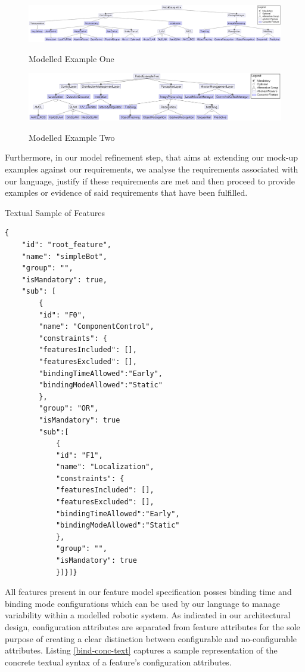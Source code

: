 \documentclass[conference]{IEEEtran}
\begin{document}
\begin{figure}[H]
\caption{Modelled Example One}
\centering
\includegraphics[width=\columnwidth]{diagrams/ex1.png}
\label{ex1}
\end{figure}

\begin{figure}[H]
\caption{Modelled Example Two}
\centering
\includegraphics[width=\columnwidth]{diagrams/ex2.png}
\label{ex2}
\end{figure}
    
Furthermore, in our model refinement step, that aims at extending our mock-up examples against our requirements, we analyse the requirements associated with our language, justify if these requirements are met and then proceed to provide examples or evidence of said requirements that have been fulfilled.

\begin{listing}
\caption{Textual Sample of Features}
\begin{verbatim}
{
    "id": "root_feature",
    "name": "simpleBot",
    "group": "",
    "isMandatory": true,
    "sub": [
        {
        "id": "F0",
        "name": "ComponentControl",
        "constraints": {
        "featuresIncluded": [],
        "featuresExcluded": [],
        "bindingTimeAllowed":"Early",
        "bindingModeAllowed":"Static"
        },
        "group": "OR",
        "isMandatory": true
        "sub":[
            {
            "id": "F1",
            "name": "Localization",
            "constraints": {
            "featuresIncluded": [],
            "featuresExcluded": [],
            "bindingTimeAllowed":"Early",
            "bindingModeAllowed":"Static"
            },
            "group": "",
            "isMandatory": true
            }]}]}
\end{verbatim}
\label{feat-conc-text}
\end{listing}

All features present in our feature model specification posses binding time and binding mode configurations which can be used by our language to manage variability within a modelled robotic system. As indicated in our architectural design, configuration attributes are separated from feature attributes for the sole purpose of creating a clear distinction between configurable and no-configurable attributes. Listing
\ref{bind-conc-text} captures a sample representation of the concrete textual syntax of a feature's configuration attributes.
\end{document}
